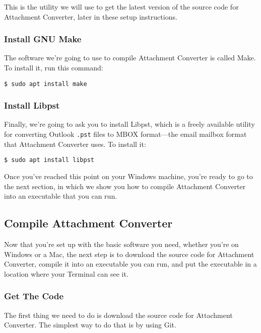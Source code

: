\documentclass[11pt]{article}
\begin{document}
This is the utility we will use to get the latest version of the
source code for Attachment Converter, later in these setup
instructions.

\subsubsection*{Install GNU Make}
\label{sec:org02a64a1}

The software we're going to use to compile Attachment Converter is
called Make.  To install it, run this command:

\begin{verbatim}
$ sudo apt install make
\end{verbatim}

\subsubsection*{Install Libpst}
\label{sec:orgeec02fe}

Finally, we're going to ask you to install Libpst, which is a freely
available utility for converting Outlook \texttt{.pst} files to MBOX
format---the email mailbox format that Attachment Converter uses.  To
install it:

\begin{verbatim}
$ sudo apt install libpst
\end{verbatim}

Once you've reached this point on your Windows machine, you're ready
to go to the next section, in which we show you how to compile
Attachment Converter into an executable that you can run.

\subsection*{Compile Attachment Converter \label{org336cbed}}
\label{sec:org6f7b1ec}

Now that you're set up with the basic software you need, whether
you're on Windows or a Mac, the next step is to download the source
code for Attachment Converter, compile it into an executable you can
run, and put the executable in a location where your Terminal can see
it.

\subsubsection*{Get The Code}
\label{sec:orgce306e5}

The first thing we need to do is download the source code for
Attachment Converter.  The simplest way to do that is by using Git.
\end{document}

